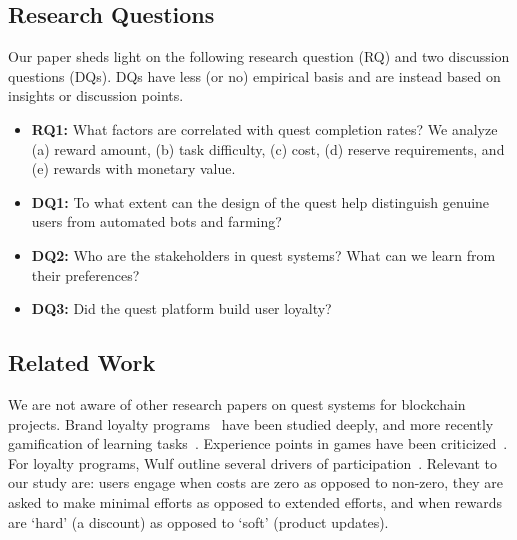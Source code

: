 
\subsection{Research Questions} 
Our paper sheds light on the following research question (RQ) and two discussion questions (DQs). DQs have less (or no) empirical basis and are instead based on insights or discussion points.

\begin{itemize}
\item \textbf{RQ1:} What factors are correlated with quest completion rates? We analyze (a) reward amount, (b) task difficulty, (c) cost, (d) reserve requirements, and (e) rewards with monetary value.
\item \textbf{DQ1:} To what extent can the design of the quest help distinguish genuine users from automated bots and farming?
\item \textbf{DQ2:} Who are the stakeholders in quest systems? What can we learn from their preferences?
\item \textbf{DQ3:} Did the quest platform build user loyalty?
\end{itemize}


\subsection{Related Work}

We are not aware of other research papers on quest systems for blockchain projects. Brand loyalty programs~\cite{DU97} have been studied deeply, and more recently gamification of learning tasks~\cite{HKS14}. Experience points in games have been criticized~\cite{Bog13}. For loyalty programs, Wulf \etal outline several drivers of participation~\cite{Wulf03}. Relevant to our study are: users engage when costs are zero as opposed to non-zero, they are asked to make minimal efforts as opposed to extended efforts, and when rewards are `hard' (\eg a discount) as opposed to `soft' (\eg product updates). 

